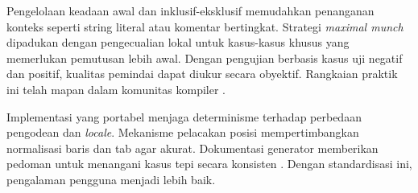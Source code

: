 \documentclass[../main.tex]{subfiles}
\begin{document}
Pengelolaan keadaan awal dan inklusif-eksklusif memudahkan penanganan konteks seperti string literal atau komentar bertingkat. Strategi \emph{maximal munch} dipadukan dengan pengecualian lokal untuk kasus-kasus khusus yang memerlukan pemutusan lebih awal. Dengan pengujian berbasis kasus uji negatif dan positif, kualitas pemindai dapat diukur secara obyektif. Rangkaian praktik ini telah mapan dalam komunitas kompiler \citep{Mogensen2010,FlexManual}.

Implementasi yang portabel menjaga determinisme terhadap perbedaan pengodean dan \emph{locale}. Mekanisme pelacakan posisi mempertimbangkan normalisasi baris dan tab agar akurat. Dokumentasi generator memberikan pedoman untuk menangani kasus tepi secara konsisten \citep{FlexManual}. Dengan standardisasi ini, pengalaman pengguna menjadi lebih baik.
\end{document}
